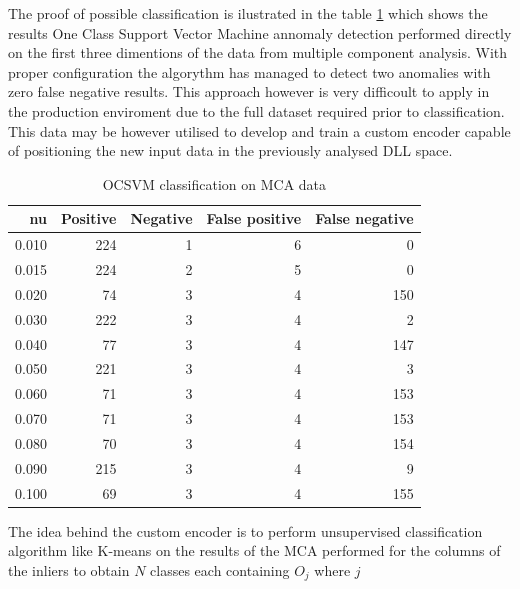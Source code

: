 \documentclass[a4paper,twoside,12pt]{book}
\begin{document}
The proof of possible classification is ilustrated in the table \ref{id:tab:OCSVMonMCA} which shows the 
results One Class Support Vector Machine annomaly detection performed directly on the first three dimentions 
of the data from multiple component analysis. With proper configuration the algorythm has managed to detect 
two anomalies with zero false negative results. This approach however is very difficoult to apply in the 
production enviroment due to the full dataset required prior to classification. This data may be however 
utilised to develop and train a custom encoder capable of positioning the new input data in the previously 
analysed DLL space.  


\begin{table}
	\centering
	\caption{OCSVM classification on MCA data}
	\label{id:tab:OCSVMonMCA}
\begin{tabular}{rrrrr}
	\toprule
		nu &  Positive &  Negative &  False positive &  False negative \\
	\midrule
	 0.010 &       224 &         1 &               6 &               0 \\
	 0.015 &       224 &         2 &               5 &               0 \\
	 0.020 &        74 &         3 &               4 &             150 \\
	 0.030 &       222 &         3 &               4 &               2 \\
	 0.040 &        77 &         3 &               4 &             147 \\
	 0.050 &       221 &         3 &               4 &               3 \\
	 0.060 &        71 &         3 &               4 &             153 \\
	 0.070 &        71 &         3 &               4 &             153 \\
	 0.080 &        70 &         3 &               4 &             154 \\
	 0.090 &       215 &         3 &               4 &               9 \\
	 0.100 &        69 &         3 &               4 &             155 \\
	\bottomrule
\end{tabular}
\end{table} 

The idea behind the custom encoder is to perform unsupervised classification algorithm 
like K-means on the results of the MCA performed for the columns of the inliers to obtain 
$\mathit{N}$ classes each containing $\mathit{O_{j}}$  where $\mathit{j}$
\end{document}
